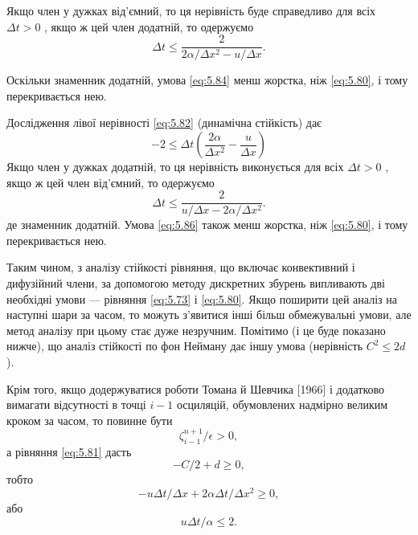 Якщо член у дужках від'ємний, то ця нерівність буде справедливо для всіх $\Delta t > 0$ , якщо ж цей член додатній, то одержуємо
\begin{equation}
    \label{eq:5.84}
    \Delta t \le \frac{2}{2 \alpha / \Delta x^2 - u / \Delta x}.    
\end{equation}

Оскільки знаменник додатній, умова \eqref{eq:5.84} менш жорстка, ніж \eqref{eq:5.80}, і тому перекривається нею. \medskip

Дослідження лівої нерівності \eqref{eq:5.82} (динамічна стійкість) дає
\begin{equation}
    \label{eq:5.85}
    -2 \le \Delta t \left( \frac{2 \alpha}{\Delta x^2} - \frac{u}{\Delta x} \right)
\end{equation}
Якщо член у дужках додатній, то ця нерівність виконується для всіх $\Delta t > 0$ , якщо ж цей член від'ємний, то одержуємо
\begin{equation}
    \label{eq:5.86}
    \Delta t \le \frac{2}{u / \Delta x - 2 \alpha / \Delta x^2}.
\end{equation}
де знаменник додатній. Умова \eqref{eq:5.86} також менш жорстка, ніж \eqref{eq:5.80}, і тому перекривається нею. \medskip

Таким чином, з аналізу стійкості рівняння, що включає конвективний і дифузійний члени, за допомогою методу дискретних збурень випливають дві необхідні умови --- рівняння \eqref{eq:5.73} і \eqref{eq:5.80}. Якщо поширити цей аналіз на наступні шари за часом, то можуть з'явитися інші більш обмежувальні умови, але метод аналізу при цьому стає дуже незручним. Помітимо (і це буде показано нижче), що аналіз стійкості по фон Нейману дає іншу умова (нерівність $C^2 \le 2 d$). \medskip

Крім того, якщо додержуватися роботи Томана й Шевчика [1966] і додатково вимагати відсутності в точці $i - 1$ осциляцій, обумовлених надмірно великим  кроком за часом, то повинне бути
\begin{equation}
    \label{eq:5.87}
    \zeta_{i - 1}^{n + 1} / \epsilon > 0,
\end{equation}
а рівняння \eqref{eq:5.81} дасть
\begin{equation}
    \label{eq:5.88}
    - C / 2 + d \ge 0,
\end{equation}
тобто
\begin{equation}
    \label{eq:5.89}
    - u \Delta t / \Delta x + 2 \alpha \Delta t / \Delta x^2 \ge 0,
\end{equation}
або
\begin{equation}
    \label{eq:5.90}
    u \Delta t / \alpha \le 2.
\end{equation}

